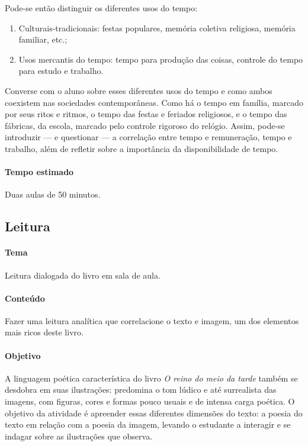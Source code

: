 \documentclass[11pt]{extarticle}
\begin{document}
Pode-se então distinguir os diferentes usos do tempo:

\begin{enumerate}
\item Culturais-tradicionais: festas populares, memória coletiva religiosa, memória familiar, etc.;
\item Usos mercantis do tempo: tempo para produção das coisas, controle do tempo para estudo e trabalho.
\end{enumerate}

Converse com o aluno sobre esses diferentes usos do tempo e como ambos coexistem nas sociedades contemporâneas. Como há o tempo em família, marcado por seus ritos e ritmos, o tempo das festas e feriados religiosos, e o tempo das fábricas, da escola, marcado pelo controle rigoroso do relógio.
Assim, pode-se introduzir --- e questionar --- a correlação entre tempo e remuneração, tempo e trabalho, além de refletir sobre a importância da disponibilidade de tempo.

\paragraph{Tempo estimado} Duas aulas de 50 minutos.


\subsection{Leitura}

\paragraph{Tema} Leitura dialogada do livro em sala de aula.

\paragraph{Conteúdo} Fazer uma leitura analítica que correlacione o texto e imagem, um dos elementos mais ricos deste livro.

\paragraph{Objetivo} A linguagem poética característica do livro \textit{O reino do meio da tarde} também se desdobra em suas ilustrações: predomina o tom lúdico e até surrealista das imagens, com figuras, cores e formas pouco usuais e de intensa carga poética. O objetivo da atividade é apreender essas diferentes dimensões do texto: a poesia do texto em relação com a poesia da imagem, levando o estudante a interagir e se indagar sobre as ilustrações que observa. 
\end{document}
